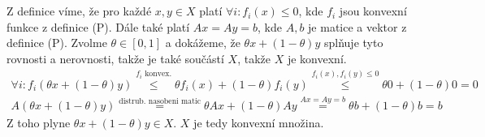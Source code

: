 \documentclass[12pt, a4paper]{article}
\begin{document}
\section{}
Z definice  víme, že pro každé $x,y \in X$ platí $\forall i: f_i(x) \leq 0$, kde $f_i$ jsou konvexní funkce z definice (P). Dále také platí $Ax=Ay=b$, kde $A,b$ je matice a vektor z definice (P). Zvolme $\theta \in [0,1]$ a dokážeme, že $\theta x + (1-\theta)y$ splňuje tyto rovnosti a nerovnosti, takže je také součástí $X$, takže $X$ je konvexní.
\begin{gather*}
\forall i: f_i(\theta x + (1-\theta)y) \stackrel{f_i \text{ konvex.}}{\leq} \theta f_i(x) + (1-\theta)f_i(y) \stackrel{f_i(x),f_i(y)\leq 0}{\leq} \theta 0 + (1-\theta)0 = 0\\
A(\theta x + (1-\theta)y)  \stackrel{\text{distrub. nasobeni matic}}{=} \theta Ax + (1-\theta) Ay \stackrel{Ax=Ay=b}{=} \theta b + (1-\theta)b = b
\end{gather*}
Z toho plyne $\theta x + (1-\theta)y \in X$. $X$ je tedy konvexní množina.
\end{document}
